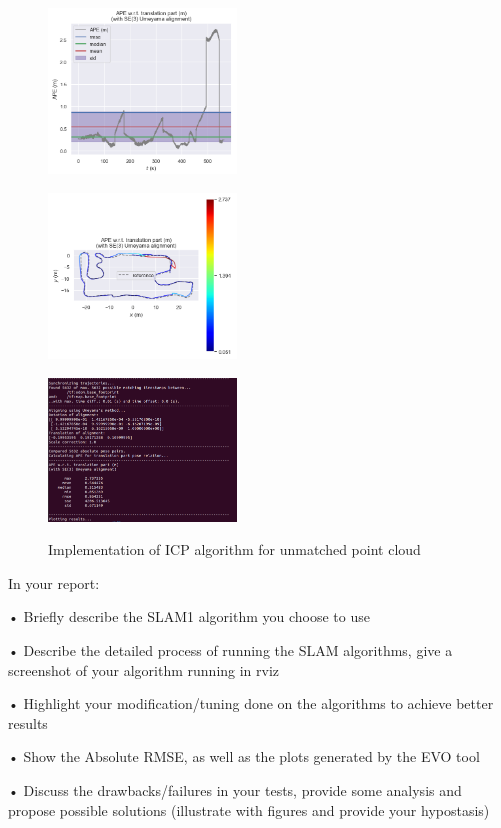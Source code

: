\documentclass[hyperref]{article}
\theoremstyle{nonumberplain}
\begin{document}
\begin{figure}[H]
	\centering
	\begin{minipage}[t]{0.32\textwidth}
		\centering
		\includegraphics[width=5cm]{3a_evo1.png}
		\label{fig6a}
	\end{minipage}
	\begin{minipage}[t]{0.32\textwidth}
		\centering
		\includegraphics[width=5cm]{3a_evo2.png}
		\label{fig6b}
	\end{minipage}
	\begin{minipage}[t]{0.32\textwidth}
		\centering
		\includegraphics[width=5cm]{3a_evo3.png}
		\label{fig6c}
	\end{minipage}
	\caption{Implementation of ICP algorithm for unmatched point cloud}
	\label{fig3}
\end{figure} 

In your report: 

•  Briefly describe the SLAM1 algorithm you choose to use 

•  Describe the detailed process of running the SLAM algorithms, give a screenshot of your 
algorithm running in rviz 

•  Highlight your modification/tuning done on the algorithms to achieve better results 

•  Show the Absolute RMSE, as well as the plots generated by the EVO tool 

•  Discuss the drawbacks/failures in your tests, provide some analysis and propose possible 
solutions (illustrate with figures and provide your hypostasis)








	
\end{document}
